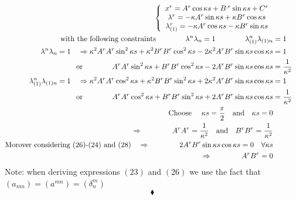 \begin{align}
\left \{ \begin{array}{c}
x^r = A^{r}\cos \kappa s   + B^{,r}\sin \kappa s + C^r\\
\lambda^r =  -\kappa A^{r}\sin \kappa s  +\kappa B^{r}\cos \kappa s\\
\lambda_{(1)}^r = - \kappa A^{r}\cos \kappa s  - \kappa B^{r}\sin \kappa s\\
\end{array} \right.\\
\text{with the following constraints}\quad\quad\quad\quad \lambda^n\lambda_n = 1\quad\quad\quad\quad 
\lambda_{(1)}^n\lambda_{(1)n} &= 1\\
\lambda^n\lambda_n = 1\quad\Rightarrow \kappa^2 A^r A^r \sin ^2 \kappa s+ \kappa^2 B^r B^r \cos ^2 \kappa s - 2 \kappa^2 A^rB^r\sin\kappa s\cos \kappa s &= 1\\
\text{or} \quad\quad\quad\quad A^r A^r \sin ^2 \kappa s+  B^r B^r \cos ^2 \kappa s - 2 A^rB^r\sin\kappa s\cos \kappa s &= \frac{1}{\kappa^2 }\\
\lambda_{(1)}^n\lambda_{(1)n} = 1\quad\Rightarrow \kappa^2 A^r A^r \cos ^2 \kappa s+ \kappa^2 B^r B^r \sin ^2 \kappa s + 2 \kappa^2 A^rB^r\sin\kappa s\cos \kappa s &= 1\\
\text{or} \quad\quad\quad\quad A^r A^r \cos ^2 \kappa s+  B^r B^r \sin ^2 \kappa s + 2 A^rB^r\sin\kappa s\cos \kappa s &= \frac{1}{\kappa^2 }\\
\text{Choose }\quad \kappa s = \frac{\pi}{2}\quad\text{and} \quad \kappa s = 0\\
\Rightarrow \quad\quad\quad\quad A^r A^r =  \frac{1}{\kappa^2 }\quad\text{and}\quad B^r B^r =  \frac{1}{\kappa^2 }\\
\text{Morover considering (26)-(24) and (28)}\quad \Rightarrow \quad\quad\quad\quad 2A^rB^r\sin \kappa s \cos \kappa s =0 \quad \forall \kappa s\\
\Rightarrow \quad\quad\quad\quad A^rB^r=0
\end{align}
Note: when deriving expressions $(23)$ and $(26)$ we use the fact that $\left(a_{mn}\right) =  \left(a^{mn}\right) = \left(\delta^m_n\right) $
$$\blacklozenge$$
\newpage

